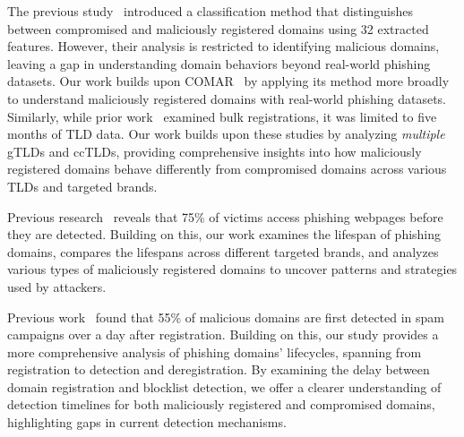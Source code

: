 The previous study~\cite{maroofi2020comar} introduced a classification method that distinguishes between compromised and maliciously registered domains using 32 extracted features. 
However, their analysis is restricted to identifying malicious domains, leaving a gap in understanding domain behaviors beyond real-world phishing datasets. 
Our work builds upon COMAR~\cite{maroofi2020comar} by applying its method more broadly to understand maliciously registered domains with real-world phishing datasets. 
Similarly, while prior work~\cite{hao2013understanding} examined bulk registrations, it was limited to five months of  TLD data.
Our work builds upon these studies by analyzing \emph{multiple} gTLDs and ccTLDs, providing comprehensive insights into how maliciously registered domains behave differently from compromised domains across various TLDs and targeted brands.

Previous research~\cite{oest2020sunrise} reveals that 75\% of victims access phishing webpages before they are detected. 
Building on this, our work examines the lifespan of phishing domains, compares the lifespans across different targeted brands, and analyzes various types of maliciously registered domains to uncover patterns and strategies used by attackers.

Previous work~\cite{hao2011monitoring} found that 55\% of malicious domains are first detected in spam campaigns over a day after registration. Building on this, our study provides a more comprehensive analysis of phishing domains' lifecycles, spanning from registration to detection and deregistration. By examining the delay between domain registration and blocklist detection, we offer a clearer understanding of detection timelines for both maliciously registered and compromised domains, highlighting gaps in current detection mechanisms.

